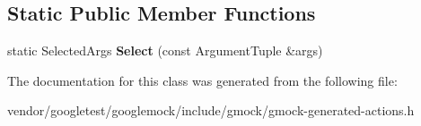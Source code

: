 \subsection*{Static Public Member Functions}
\begin{DoxyCompactItemize}
\item 
\mbox{\label{classtesting_1_1internal_1_1_select_args_3_01_result_00_01_argument_tuple_00_01k1_00_01k2_00_01kf4b89906ed32c76471b80b75f77e1355_a0cf7d28342dd284de849c9776387c192}} 
static Selected\+Args {\bfseries Select} (const Argument\+Tuple \&args)
\end{DoxyCompactItemize}


The documentation for this class was generated from the following file\+:\begin{DoxyCompactItemize}
\item 
vendor/googletest/googlemock/include/gmock/gmock-\/generated-\/actions.\+h\end{DoxyCompactItemize}
